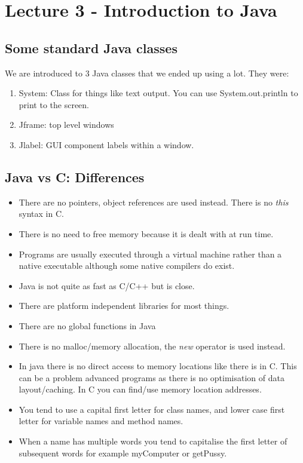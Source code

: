 \documentclass{article}
\begin{document}
\section{Lecture 3 - Introduction to Java}

\subsection{Some standard Java classes}

We are introduced to 3 Java classes that we ended up using a lot. They were:

\begin{enumerate}
\item System: Class for things like text output. You can use System.out.println to print to the screen.
\item Jframe: top level windows
\item Jlabel: GUI component labels within a window.
\end{enumerate}

\subsection{Java vs C: Differences}

\begin{itemize}
\item There are no pointers, object references are used instead. There is no \emph{this} syntax in C.
\item There is no need to free memory because it is dealt with at run time.
\item Programs are usually executed through a virtual machine rather than a native executable
      although some native compilers do exist.
\item Java is not quite as fast as C/C++ but is close.
\item There are platform independent libraries for most things.
\item There are no global functions in Java
\item There is no malloc/memory allocation, the \emph{new} operator is used instead. 
\item In java there is no direct access to memory locations like there is in C. This can be a problem
      advanced programs as there is no optimisation of data layout/caching. In C you can find/use
      memory location addresses.
\item You tend to use a capital first letter for class names, and lower case first letter for variable
      names and method names.
\item When a name has multiple words you tend to capitalise the first letter of subsequent words
      for example myComputer or getPussy.
\end{itemize}
\end{document}
